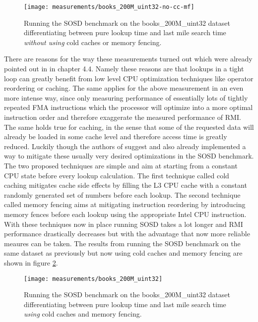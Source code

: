 \begin{figure}[!h]
  \centering
  \texttt{[image: measurements/books\_200M\_uint32-no-cc-mf]}
  \caption[Pure lookup and last mile search time measures]{
    Running the SOSD benchmark on the books\_200M\_uint32 dataset differentiating between pure lookup time and last mile search time \emph{without using} cold caches or memory fencing.
  }
  \label{fig:books_200M_uint32-no-cc-mf}
\end{figure}

There are reasons for the way these measurements turned out which were already pointed out in \cite{sosd-neurips} in chapter 4.4. Namely these reasons are that lookups in a tight loop can greatly benefit from low level CPU optimization techniques like operator reordering or caching. The same applies for the above measurement in an even more intense way, since only measuring performance of essentially lots of tightly repeated FMA instructions which the processor will optimize into a more optimal instruction order and therefore exaggerate the measured performance of RMI. The same holds true for caching, in the sense that some of the requested data will already be loaded in some cache level and therefore access time is greatly reduced. Luckily though the authors of \cite{sosd-neurips} suggest and also already implemented a way to mitigate these usually very desired optimizations in the SOSD benchmark. The two proposed techniques are simple and aim at starting from a constant CPU state before every lookup calculation. The first technique called cold caching mitigates cache side effects by filling the L3 CPU cache with a constant randomly generated set of numbers before each lookup. The second technique called memory fencing aims at mitigating instruction reordering by introducing memory fences before each lookup using the appropriate Intel CPU instruction. With these techniques now in place running SOSD takes a lot longer and RMI performance drastically decreases but with the advantage that now more reliable meaures can be taken. The results from running the SOSD benchmark on the same dataset as previously but now using cold caches and memory fencing are shown in figure \ref{fig:books_200M_uint32}.

\begin{figure}[ht]
  \centering
  \texttt{[image: measurements/books\_200M\_uint32]}
  \caption[Lookup and last mile search time measures using cold caches and memory fencing]{
    Running the SOSD benchmark on the books\_200M\_uint32 dataset differentiating between pure lookup time and last mile search time \emph{using} cold caches and memory fencing.
  }
  \label{fig:books_200M_uint32}
\end{figure}


